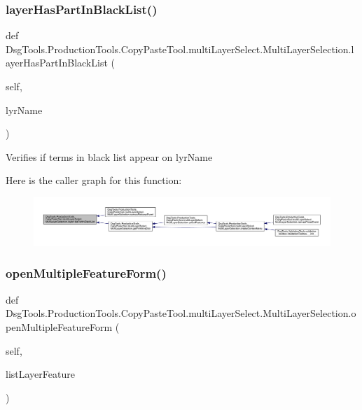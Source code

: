 \subsubsection{\texorpdfstring{layer\+Has\+Part\+In\+Black\+List()}{layerHasPartInBlackList()}}
{\footnotesize\ttfamily def Dsg\+Tools.\+Production\+Tools.\+Copy\+Paste\+Tool.\+multi\+Layer\+Select.\+Multi\+Layer\+Selection.\+layer\+Has\+Part\+In\+Black\+List (\begin{DoxyParamCaption}\item[{}]{self,  }\item[{}]{lyr\+Name }\end{DoxyParamCaption})}

\begin{DoxyVerb}Verifies if terms in black list appear on lyrName
\end{DoxyVerb}
 Here is the caller graph for this function\+:
\nopagebreak
\begin{figure}[H]
\begin{center}
\leavevmode
\includegraphics[width=350pt]{class_dsg_tools_1_1_production_tools_1_1_copy_paste_tool_1_1multi_layer_select_1_1_multi_layer_selection_a70d66faf08affdbc098675d3226aed5b_icgraph}
\end{center}
\end{figure}
\mbox{\label{class_dsg_tools_1_1_production_tools_1_1_copy_paste_tool_1_1multi_layer_select_1_1_multi_layer_selection_a6508f006e6f74fb040286a58d845f774}} 
\subsubsection{\texorpdfstring{open\+Multiple\+Feature\+Form()}{openMultipleFeatureForm()}}
{\footnotesize\ttfamily def Dsg\+Tools.\+Production\+Tools.\+Copy\+Paste\+Tool.\+multi\+Layer\+Select.\+Multi\+Layer\+Selection.\+open\+Multiple\+Feature\+Form (\begin{DoxyParamCaption}\item[{}]{self,  }\item[{}]{list\+Layer\+Feature }\end{DoxyParamCaption})}

